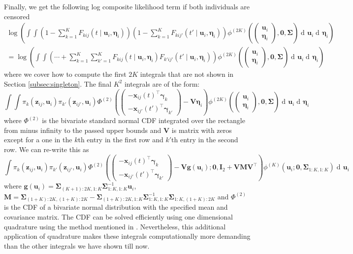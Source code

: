 \documentclass{article}
\newcommand\mat[1]{\mathbf{#1}}
\renewcommand\vec{\bm}
\newcommand\der{\operatorname{d\!}{}}
\begin{document}
Finally, we get the following log composite likelihood term if both individuals 
are censored %
%
\begin{multline*}
\log\left(\int\int\left(1 - \sum_{k = 1}^K F_{kij}(t\mid \vec u_i, \vec\eta_i)\right)
  \left(1 - \sum_{k = 1}^K F_{kij'}(t'\mid \vec u_i, \vec\eta_i)\right)
   \phi^{(2K)}\left(
      \begin{pmatrix}
        \vec u_i \\ \vec\eta_i
      \end{pmatrix}, \vec 0,\mat \Sigma\right)
  \der \vec u_i\der \vec\eta_i\right) \\
  =\log\left(\int\int\left(\cdots + \sum_{k = 1}^K\sum_{k' = 1}^K
    F_{kij}(t\mid \vec u_i, \vec\eta_i)F_{k'ij'}(t'\mid \vec u_i, \vec\eta_i)\right)
    \phi^{(2K)}\left(
      \begin{pmatrix}
        \vec u_i \\ \vec\eta_i
      \end{pmatrix}, \vec 0,\mat \Sigma\right)    
    \der \vec u_i\der \vec\eta_i\right)
\end{multline*}%
%
where we cover how to compute the first $2K$ 
integrals that 
are not shown in Section \ref{subsec:singleton}. 
The final $K^2$ integrals are of the form: %
%
$$
 \int\int \pi_k(\vec z_{ij},\vec u_i)
   \pi_{k'}(\vec z_{ij'},\vec u_i)\Phi^{(2)}
   \left(\begin{pmatrix}
     -\vec x_{ij}(t)^\top\vec\gamma_k\\
     -\vec x_{ij'}(t')^\top\vec\gamma_{k'}
   \end{pmatrix} - \mat V\vec\eta_i
   \right)
   \phi^{(2K)}\left(
      \begin{pmatrix}
        \vec u_i \\ \vec\eta_i
      \end{pmatrix}, \vec 0,\mat \Sigma\right)
  \der \vec u_i\der \vec\eta_i
$$%
%
where $\Phi^{(2)}$ is the bivariate standard normal CDF integrated 
over the rectangle
from minus infinity to the passed upper bounds and $\mat V$ is 
matrix with zeros except for a one in the $k$th entry in the 
first row and $k'$th entry in the second row. We can re-write this 
as %
%
$$
\int \pi_k(\vec z_{ij},\vec u_i)
   \pi_{k'}(\vec z_{ij'},\vec u_i)\Phi^{(2)}
   \left(\begin{pmatrix}
     -\vec x_{ij}(t)^\top\vec\gamma_k\\
     -\vec x_{ij'}(t')^\top\vec\gamma_{k'}
   \end{pmatrix} - \mat V\vec g(\vec u_i);
   \vec 0, \mat I_2 + \mat V\mat M\mat V^\top
   \right)
   \phi^{(K)}\left(
    \vec u_i; 
    \vec 0 ,
    \mat \Sigma_{1:K, 1:K}
    \right)\der\vec u_i
$$%
%
where $\vec g(\vec u_i) = \mat\Sigma_{(K + 1):2K,1:K}\mat\Sigma_{1:K,1:K}^{-1}\vec u_i$,
$\mat M = \mat\Sigma_{(1 + K):2K,(1 + K):2K} - \mat\Sigma_{(1 + K):2K,1:K}\mat\Sigma_{1:K,1:K}^{-1}\mat\Sigma_{1:K,(1 + K):2K}$ and 
$\Phi^{(2)}$ is the CDF of a bivariate normal distribution with the specified mean 
and covariance matrix. The CDF can be solved efficiently 
using one dimensional quadrature using the 
method mentioned in \cite{Genz04}. 
Nevertheless, this additional application of quadrature 
makes these integrals computationally more demanding than the other integrals we 
have shown till now. 
\end{document}
